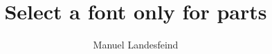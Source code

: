 \documentclass{article}
\title{Select a font only for parts}
\author{Manuel Landesfeind}
\begin{document}
\maketitle

\renewcommand{\rmdefault}{times}
\normalfont

\blindtext[1]
\end{document}
